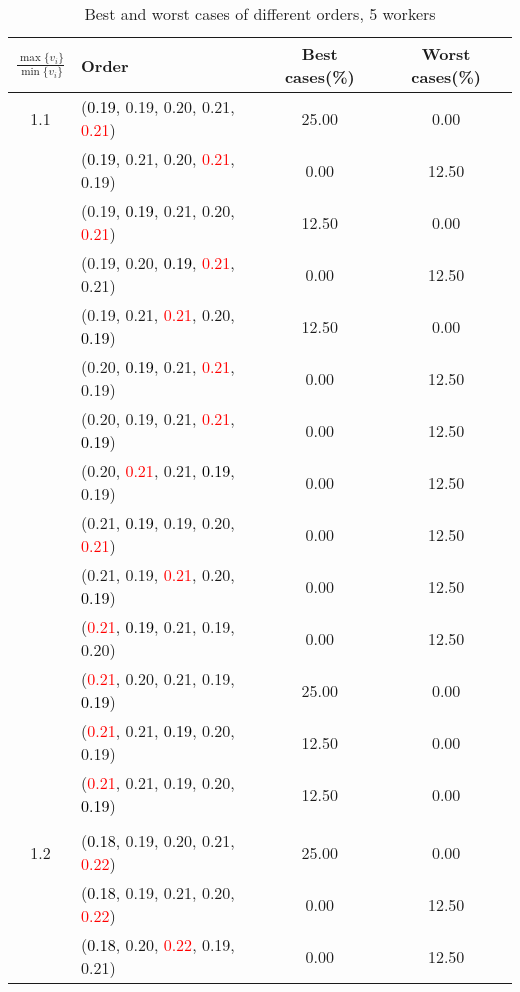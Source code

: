\documentclass[10pt,a4paper]{report}
\begin{document}
\newpage\begin{center}
	\small
	\begin{longtable}{clcc}
		\caption{Best and worst cases of different orders, 5 workers}\\
		\toprule
		\setlength{\tabcolsep}{1mm}
		\renewcommand\baselinestretch{0.5}\selectfont
		$\frac{\max\{v_i\}}{\min\{v_i\}}$ & Order & Best cases(\%) & Worst cases(\%) \\
			\midrule		1.1			&(\textcolor{black}{0.19}, 0.19, 0.20, 0.21, \textcolor{red}{0.21})&25.00&0.00\\
			&(\textcolor{black}{0.19}, 0.21, 0.20, \textcolor{red}{0.21}, 0.19)&0.00&12.50\\
			&(0.19, \textcolor{black}{0.19}, 0.21, 0.20, \textcolor{red}{0.21})&12.50&0.00\\
			&(0.19, 0.20, \textcolor{black}{0.19}, \textcolor{red}{0.21}, 0.21)&0.00&12.50\\
			&(0.19, 0.21, \textcolor{red}{0.21}, 0.20, \textcolor{black}{0.19})&12.50&0.00\\
			&(0.20, \textcolor{black}{0.19}, 0.21, \textcolor{red}{0.21}, 0.19)&0.00&12.50\\
			&(0.20, 0.19, 0.21, \textcolor{red}{0.21}, \textcolor{black}{0.19})&0.00&12.50\\
			&(0.20, \textcolor{red}{0.21}, 0.21, \textcolor{black}{0.19}, 0.19)&0.00&12.50\\
			&(0.21, \textcolor{black}{0.19}, 0.19, 0.20, \textcolor{red}{0.21})&0.00&12.50\\
			&(0.21, 0.19, \textcolor{red}{0.21}, 0.20, \textcolor{black}{0.19})&0.00&12.50\\
			&(\textcolor{red}{0.21}, \textcolor{black}{0.19}, 0.21, 0.19, 0.20)&0.00&12.50\\
			&(\textcolor{red}{0.21}, 0.20, 0.21, 0.19, \textcolor{black}{0.19})&25.00&0.00\\
			&(\textcolor{red}{0.21}, 0.21, \textcolor{black}{0.19}, 0.20, 0.19)&12.50&0.00\\
			&(\textcolor{red}{0.21}, 0.21, 0.19, 0.20, \textcolor{black}{0.19})&12.50&0.00\\
		&&&\\
		1.2			&(\textcolor{black}{0.18}, 0.19, 0.20, 0.21, \textcolor{red}{0.22})&25.00&0.00\\
			&(\textcolor{black}{0.18}, 0.19, 0.21, 0.20, \textcolor{red}{0.22})&0.00&12.50\\
			&(\textcolor{black}{0.18}, 0.20, \textcolor{red}{0.22}, 0.19, 0.21)&0.00&12.50\\

\end{longtable}
\end{center}
\end{document}
